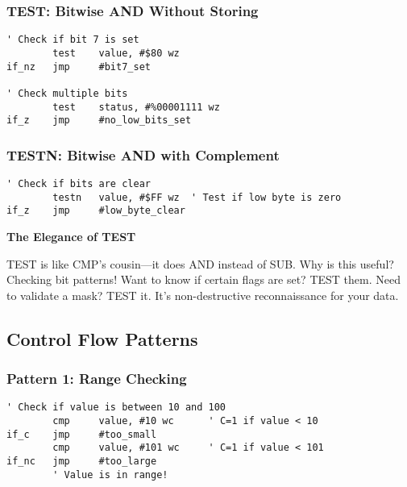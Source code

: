 \documentclass[11pt]{book}
\begin{document}
\hypertarget{test-bitwise-and-without-storing}{%
\subsubsection{TEST: Bitwise AND Without
Storing}\label{test-bitwise-and-without-storing}}

\begin{lstlisting}
' Check if bit 7 is set
        test    value, #$80 wz
if_nz   jmp     #bit7_set

' Check multiple bits
        test    status, #%00001111 wz
if_z    jmp     #no_low_bits_set
\end{lstlisting}

\hypertarget{testn-bitwise-and-with-complement}{%
\subsubsection{TESTN: Bitwise AND with
Complement}\label{testn-bitwise-and-with-complement}}

\begin{lstlisting}
' Check if bits are clear
        testn   value, #$FF wz  ' Test if low byte is zero
if_z    jmp     #low_byte_clear
\end{lstlisting}

\begin{interlude}
\textbf{The Elegance of TEST}

TEST is like CMP's cousin—it does AND instead of SUB. Why is this useful? Checking bit patterns! Want to know if certain flags are set? TEST them. Need to validate a mask? TEST it. It's non-destructive reconnaissance for your data.
\end{interlude}

\hypertarget{control-flow-patterns}{%
\subsection{Control Flow Patterns}\label{control-flow-patterns}}

\hypertarget{pattern-1-range-checking}{%
\subsubsection{Pattern 1: Range
Checking}\label{pattern-1-range-checking}}

\begin{lstlisting}
' Check if value is between 10 and 100
        cmp     value, #10 wc      ' C=1 if value < 10
if_c    jmp     #too_small
        cmp     value, #101 wc     ' C=1 if value < 101
if_nc   jmp     #too_large
        ' Value is in range!
\end{lstlisting}
\end{document}
